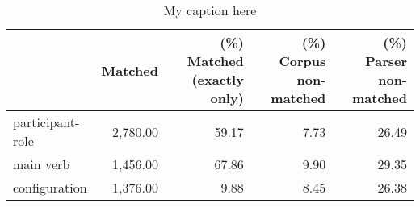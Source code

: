 \begin{table}[!ht]
\centering
\begin{tabular}{lrrrr}
\toprule
{} &  Matched &  (\%) Matched (exactly only) &  (\%) Corpus non-matched &  (\%) Parser non-matched \\
\midrule
participant-role & 2,780.00 &                       59.17 &                    7.73 &                   26.49 \\
main verb        & 1,456.00 &                       67.86 &                    9.90 &                   29.35 \\
configuration    & 1,376.00 &                        9.88 &                    8.45 &                   26.38 \\
\bottomrule
\end{tabular}
\caption{My caption here}
\label{tab:unit-elements-transitivity-relative}
\end{table}